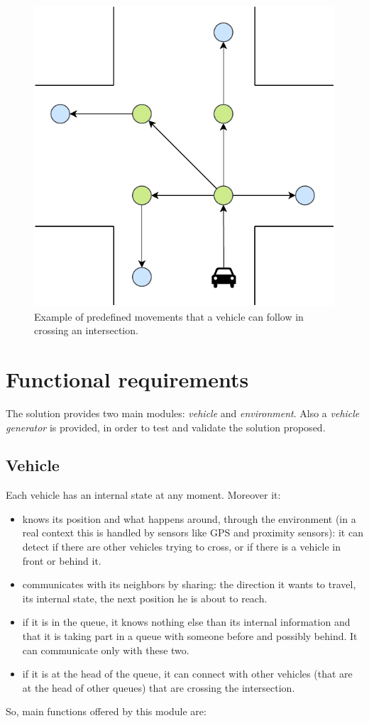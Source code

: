 \documentclass{memoir}
\begin{document}
\begin{figure}
	\centering
	\includegraphics[width=0.4\linewidth]{intersection_graph.pdf}
	\caption{Example of predefined movements that a vehicle can follow in crossing an intersection.}
	\label{fig:intersection-graph}
\end{figure}

\section{Functional requirements}
The solution provides two main modules: \emph{vehicle} and \emph{environment}. Also a \emph{vehicle generator} is provided, in order to test and validate the solution proposed.

\subsection{Vehicle}
Each vehicle has an internal state at any moment. Moreover it:

\begin{itemize}
	\item knows its position and what happens around, through the environment (in a real context this is handled by sensors like GPS and proximity sensors): it can detect if there are other vehicles trying to cross, or if there is a vehicle in front or behind it.
	\item communicates with its neighbors by sharing: the direction it wants to travel, its internal state, the next position he is about to reach.
	\item if it is in the queue, it knows nothing else than its internal information and that it is taking part in a queue with someone before and possibly behind. It can communicate only with these two.
	\item if it is at the head of the queue, it can connect with other vehicles (that are at the head of other queues) that are crossing the intersection.
\end{itemize}
So, main functions offered by this module are:
\end{document}
